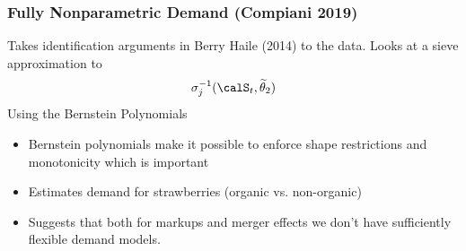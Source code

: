 \begin{frame}
\frametitle{Fully Nonparametric Demand (Compiani 2019)}
Takes identification arguments in Berry Haile (2014) to the data. Looks at a sieve approximation to
\begin{align*}
\sigma_{j}^{-1}(\calS_t,\widetilde{\theta}_2)
\end{align*}
Using the \alert{Bernstein Polynomials}
\begin{itemize}
\item Bernstein polynomials make it possible to enforce shape restrictions and \alert{monotonicity} which is important
\item Estimates demand for strawberries (organic vs. non-organic)
\item Suggests that both for markups and merger effects we don't have sufficiently flexible demand models.
\end{itemize}
\end{frame}


%
%



%





